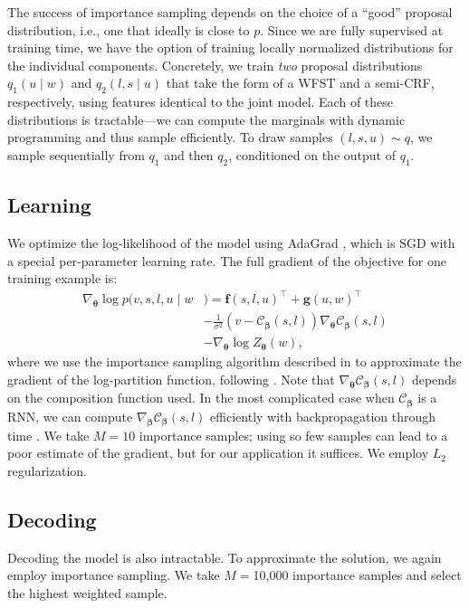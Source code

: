 \documentclass[11pt,letterpaper]{article}
\newcommand{\software}[1]{{\sc #1}}
\newcommand{\CC}{\mathcal{C}_{\vbeta}}
\renewcommand{\vec}{\boldsymbol}
\newcommand{\vtheta}{{\vec{\theta}}}
\newcommand{\vbeta}{{\vec{\beta}}}
\newcommand{\vf}{{\vec{f}}}
\newcommand{\vg}{{\vec{g}}}
\newcommand{\vv}{v}
\begin{document}
The success of importance sampling depends  on the choice of
a ``good'' proposal distribution, i.e., one that ideally is
close to $p$.  Since we are fully supervised at
training time, we have the option of training locally normalized
distributions for the individual components. Concretely, we train {\em
  two} proposal distributions $q_1(u \mid w)$ and $q_2(l, s \mid u)$ that
take the form of a WFST and a semi-CRF, respectively, using 
features identical to the joint model. Each of these
distributions is tractable---we can compute the marginals with dynamic
programming and thus sample efficiently. To draw samples $(l, s, u) \sim
q$, we sample sequentially from $q_1$ and then $q_2$, conditioned on the output of
$q_1$.

\subsection{Learning}
We optimize the log-likelihood of the model using \software{AdaGrad}
\cite{duchi2011adaptive}, which is SGD with a special per-parameter learning rate. 
The full gradient of the objective for one training example is:
\begin{align}
\nabla_{\vtheta} \log  p(\vv, s,l,u \mid w&) = \vf(s, l, u)^{\top} + \vg(u, w)^{\top}  \nonumber \\
 & -\frac{1}{\sigma^2}(\vv - \CC(s, l))\nabla_{\vtheta}\CC(s, l) \nonumber \\ &  - \nabla_{\vtheta} \log Z_{\vtheta}(w), 
\end{align}
where we use the importance sampling algorithm described in
 to approximate the gradient of the log-partition
function, following . Note that $\nabla_{\vtheta}\CC(s, l)$ depends on the
composition function used. In the most complicated case when $\CC$ is
a RNN, we can compute $\nabla_{\vbeta}\CC(s, l)$ efficiently with
backpropagation through time \cite{werbos1990backpropagation}. We take
$M=10$ importance samples; using so few samples can lead to a poor
estimate of the gradient, but for our application it suffices.  We employ $L_2$ regularization.

\subsection{Decoding}
Decoding the model is also intractable. To approximate the solution,
we again employ importance sampling. We take $M=$10,000 importance
samples and select the highest weighted sample.
\end{document}
